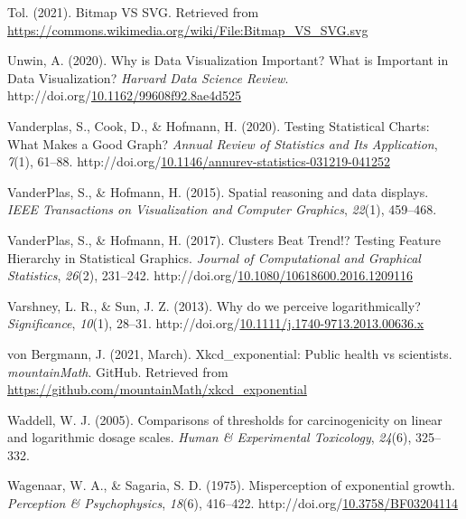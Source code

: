 \documentclass[print]{nuthesis}
\newlength{\cslhangindent}
\newenvironment{CSLReferences}%
{\setlength{\parindent}{0pt}%
\everypar{\setlength{\hangindent}{\cslhangindent}}\ignorespaces}%
{\par}
\begin{document}
\begin{CSLReferences}{1}{0}
\leavevmode{}%
Tol. (2021). Bitmap VS SVG. Retrieved from \url{https://commons.wikimedia.org/wiki/File:Bitmap_VS_SVG.svg}

\leavevmode{}%
Unwin, A. (2020). Why is {Data} {Visualization} {Important}? {What} is {Important} in {Data} {Visualization}? \emph{Harvard Data Science Review}. http://doi.org/\href{https://doi.org/10.1162/99608f92.8ae4d525}{10.1162/99608f92.8ae4d525}

\leavevmode{}%
Vanderplas, S., Cook, D., \& Hofmann, H. (2020). Testing {Statistical} {Charts}: {What} {Makes} a {Good} {Graph}? \emph{Annual Review of Statistics and Its Application}, \emph{7}(1), 61--88. http://doi.org/\href{https://doi.org/10.1146/annurev-statistics-031219-041252}{10.1146/annurev-statistics-031219-041252}

\leavevmode{}%
VanderPlas, S., \& Hofmann, H. (2015). Spatial reasoning and data displays. \emph{IEEE Transactions on Visualization and Computer Graphics}, \emph{22}(1), 459--468.

\leavevmode{}%
VanderPlas, S., \& Hofmann, H. (2017). Clusters {Beat} {Trend}!? {Testing} {Feature} {Hierarchy} in {Statistical} {Graphics}. \emph{Journal of Computational and Graphical Statistics}, \emph{26}(2), 231--242. http://doi.org/\href{https://doi.org/10.1080/10618600.2016.1209116}{10.1080/10618600.2016.1209116}

\leavevmode{}%
Varshney, L. R., \& Sun, J. Z. (2013). Why do we perceive logarithmically? \emph{Significance}, \emph{10}(1), 28--31. http://doi.org/\href{https://doi.org/10.1111/j.1740-9713.2013.00636.x}{10.1111/j.1740-9713.2013.00636.x}

\leavevmode{}%
von Bergmann, J. (2021, March). Xkcd\_exponential: Public health vs scientists. \emph{mountainMath}. GitHub. Retrieved from \url{https://github.com/mountainMath/xkcd_exponential}

\leavevmode{}%
Waddell, W. J. (2005). Comparisons of thresholds for carcinogenicity on linear and logarithmic dosage scales. \emph{Human \& Experimental Toxicology}, \emph{24}(6), 325--332.

\leavevmode{}%
Wagenaar, W. A., \& Sagaria, S. D. (1975). Misperception of exponential growth. \emph{Perception \& Psychophysics}, \emph{18}(6), 416--422. http://doi.org/\href{https://doi.org/10.3758/BF03204114}{10.3758/BF03204114}


\end{CSLReferences}
\end{document}
